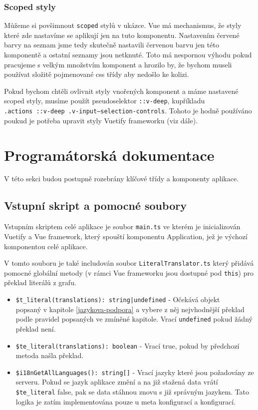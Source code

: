 \subsubsection*{Scoped styly}

Můžeme si povšimnout \texttt{scoped} stylů v ukázce. Vue má mechanismus, že styly které zde nastavíme se aplikují jen na tuto komponentu. Nastavením červené barvy na seznam jsme tedy skutečně nastavili červenou barvu jen této komponentě a ostatní seznamy jsou netknuté. Toto má nespornou výhodu pokud pracujeme s velkým množstvím komponent a hrozilo by, že bychom museli používat složitě pojmenované css třídy aby nedošlo ke kolizi.

Pokud bychom chtěli ovlivnit styly vnořených komponent a máme nastavené scoped styly, musíme použít pseudoselektor \texttt{::v-deep}, kupříkladu \\  \texttt{.actions ::v-deep .v-input--selection-controls}. Tohoto je hodně používáno poukud je potřeba upravit styly Vuetify frameworku (viz dále).

\newpage

\section{Programátorská dokumentace}
V této sekci budou postupně rozebrány klíčové třídy a komponenty aplikace.

\subsection{Vstupní skript a pomocné soubory}
Vstupním skriptem celé aplikace je soubor \texttt{main.ts} ve kterém je inicializován Vuetify a Vue framework, který spouští komponentu Application, jež je výchozí komponentou celé aplikace.

V tomto souboru je také includován soubor \texttt{LiteralTranslator.ts} který přidává pomocné globální metody (v rámci Vue frameworku jsou dostupné pod \texttt{this}) pro překlad literálů z grafu.

\begin{itemize}
  \item \texttt{\$t_literal(translations): string|undefined} - Očekává objekt \\popsaný v kapitole \ref{jazykova-podpora} a vybere z něj nejvhodnější překlad podle pravidel popsaných ve zmíněné kapitole. Vrací \texttt{undefined} pokud žádný překlad není.

  \item \texttt{\$te_literal(translations): boolean} - Vrací true, pokud by předchozí metoda našla překlad.

  \item \texttt{\$i18nGetAllLanguages(): string[]} - Vrací jazyky které jsou požadovány ze serveru. Pokud se jazyk aplikace změní a na již stažená data vrátí \texttt{\$te_literal} false, pak se data stáhnou znovu s již správným jazykem. Tato logika je zatím implementována pouze u meta konfigurací a konfigurací.
\end{itemize}

